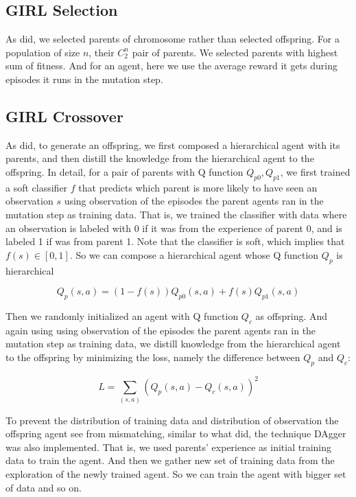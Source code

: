 \documentclass[a4paper]{article}
\begin{document}
\subsection{GIRL Selection}
\label{sec:GIRL-selection}

As \cite{DBLP:journals/corr/abs-1711-01012} did, we selected parents of chromosome rather than selected offspring. For a population of size $n$, their $C^n_2$ pair of parents. We selected parents with highest sum of fitness. And for an agent, here we use the average reward it gets during episodes it runs in the mutation step.

\subsection{GIRL Crossover}
\label{sec:GIRL-crossover}

As \cite{DBLP:journals/corr/abs-1711-01012} did, to generate an offspring, we first composed a hierarchical agent with its parents, and then distill the knowledge from the hierarchical agent to the offspring. In detail, for a pair of parents with Q function $Q_{p0}, Q_{p1}$, we first trained a soft classifier $f$ that predicts which parent is more likely to have seen an observation $s$ using observation of the episodes the parent agents ran in the mutation step as training data. That is, we trained the classifier with data where an observation is labeled with 0 if it was from the experience of parent 0, and is labeled 1 if was from parent 1. Note that the classifier is soft, which implies that $f(s) \in [0, 1]$. So we can compose a hierarchical agent whose Q function $Q_p$ is hierarchical 

\begin{equation}
Q_p(s, a) = (1 - f(s)) Q_{p0}(s, a) + f(s) Q_{p1}(s, a)
\end{equation}

Then we randomly initialized an agent with Q function $Q_c$ as offspring. And again using using observation of the episodes the parent agents ran in the mutation step as training data, we distill knowledge from the hierarchical agent to the offspring by minimizing the loss, namely the difference between $Q_p$ and $Q_c$:

\begin{equation}
L = \sum_{(s, a)} (Q_p(s, a) - Q_c(s, a))^2
\end{equation}

To prevent the distribution of training data and distribution of observation the offspring agent see from mismatching, similar to what \cite{DBLP:journals/corr/abs-1711-01012} did, the technique DAgger \cite{DBLP:journals/jmlr/RossGB11} was also implemented. That is, we used parents' experience as initial training data to train the agent. And then we gather new set of training data from the exploration of the newly trained agent. So we can train the agent with bigger set of data and so on.
\end{document}
